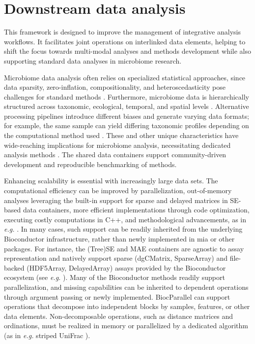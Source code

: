 \documentclass[
  sn-nature,
]{sn-jnl}
\begin{document}
\label{fig:workflow}

\section{Downstream data analysis}\label{sec-analysis}

This framework is designed to improve the management of integrative
analysis workflows. It facilitates joint operations on interlinked data
elements, helping to shift the focus towards multi-modal analyses and
methods development while also supporting standard data analyses in
microbiome research.

Microbiome data analysis often relies on specialized statistical
approaches, since data sparsity, zero-inflation, compositionality, and
heteroscedasticity pose challenges for standard methods
\citep{gloor2017, jeganathan2021}. Furthermore, microbiome data is
hierarchically structured across taxonomic, ecological, temporal, and
spatial levels \citep{moreno-indias2021, ruuskanen2021}. Alternative
processing pipelines introduce different biases and generate varying
data formats; for example, the same sample can yield differing taxonomic
profiles depending on the computational method used \citep{quince2017}.
These and other unique characteristics have wide-reaching implications
for microbiome analysis, necessitating dedicated analysis methods
\citep{moreno-indias2021}. The shared data containers support
community-driven development and reproducible benchmarking of methods.

Enhancing scalability is essential with increasingly large data sets.
The computational efficiency can be improved by parallelization,
out-of-memory analyses leveraging the built-in support for sparse and
delayed matrices in SE-based data containers, more efficient
implementations through code optimization, executing costly computations
in C++, and methodological advancements, as in \emph{e.g.}
\citep{armstrong2021}. In many cases, such support can be readily
inherited from the underlying Bioconductor infrastructure, rather than
newly implemented in mia or other packages. For instance, the (Tree)SE
and MAE containers are agnostic to assay representation and natively
support sparse (dgCMatrix, SparseArray) and file-backed (HDF5Array,
DelayedArray) assays provided by the Bioconductor ecosystem (see
\emph{e.g.} \citep{huber2015}). Many of the Bioconductor methods readily
support parallelization, and missing capabilities can be inherited to
dependent operations through argument passing or newly implemented.
BiocParallel can support operations that decompose into independent
blocks by samples, features, or other data elements. Non-decomposable
operations, such as distance matrices and ordinations, must be realized
in memory or parallelized by a dedicated algorithm (as in \emph{e.g.}
striped UniFrac \citep{mcdonald2018}).
\end{document}

